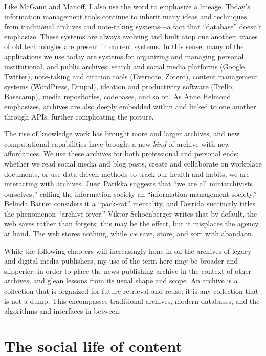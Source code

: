 Like McGann and Manoff, I also use the word to emphasize a lineage. Today's information management tools continue to inherit many ideas and techniques from traditional archives and note-taking systems---a fact that ``database'' doesn't emphasize. These systems are always evolving and built atop one another; traces of old technologies are present in current systems. In this sense, many of the applications we use today are systems for organizing and managing personal, institutional, and public archives: search and social media platforms (Google, Twitter), note-taking and citation tools (Evernote, Zotero), content management systems (WordPress, Drupal), ideation and productivity software (Trello, Basecamp), media repositories, codebases, and so on. As Anne Helmond emphasizes, archives are also deeply embedded within and linked to one another through APIs, further complicating the picture.\autocite{helmond_exploring_2013}

The rise of knowledge work has brought more and larger archives, and new computational capabilities have brought a new \emph{kind} of archive with new affordances. We use these archives for both professional and personal ends; whether we read social media and blog posts, create and collaborate on workplace documents, or use data-driven methods to track our health and habits, we are interacting with archives. Jussi Parikka suggests that ``we are all miniarchivists ourselves,'' calling the information society an ``information management society.''\autocite[2]{ernst_archival_2012} Belinda Barnet considers it a ``pack-rat'' mentality, and Derrida succinctly titles the phenomenon ``archive fever.'' Viktor Schoenberger writes that by default, the web saves rather than forgets; this may be the effect, but it misplaces the agency at hand.\autocite{schoenberger_useful_2007} The web stores nothing, while \emph{we} save, store, and sort with abandaon.

While the following chapters will increasingly hone in on the archives of legacy and digital media publishers, my use of the term here may be broader and slipperier, in order to place the news publishing archive in the context of other archives, and glean lessons from its usual shape and scope. An archive is a collection that is organized for future retrieval and reuse; it is any collection that is not a dump. This encompasses traditional archives, modern databases, and the algorithms and interfaces in between.

\section{The social life of content}


